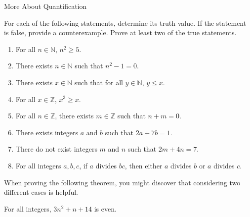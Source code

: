 \begin{section}{More About Quantification}
\begin{problem}
For each of the following statements, determine its truth value.  If the statement is false, provide a counterexample.  Prove at least two of the true statements.
\begin{enumerate}
\item For all $n\in\mathbb{N}$, $n^2\geq 5$.

\item There exists $n \in \mathbb{N}$ such that $n^2-1=0$.

\item There exists $x \in \mathbb{N}$ such that for all $y \in \mathbb{N}$, $y \leq x$.

\item For all $x\in\mathbb{Z}$, $x^3\geq x$.

\item For all $n\in\mathbb{Z}$, there exists $m\in\mathbb{Z}$ such that $n+m=0$.

\item There exists integers $a$ and $b$ such that $2a+7b=1$.

\item There do not exist integers $m$ and $n$ such that $2m+4n=7$.

\item For all integers $a, b, c$, if $a$ divides $bc$, then either $a$ divides $b$ or $a$ divides $c$.

\end{enumerate}

\end{problem}

When proving the following theorem, you might discover that considering two different cases is helpful.

\begin{theorem}
For all integers, $3n^2+n+14$ is even.
\end{theorem}

\end{section}